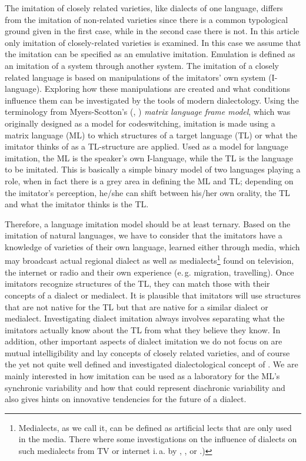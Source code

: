 \documentclass[output=paper]{LSP/langsci}
\begin{document}
The imitation of closely related varieties, like dialects of one language, differs from the imitation of non-related varieties since there is a common typological ground given in the first case, while in the second case there is not. In this article only imitation of closely-related varieties is examined. In this case we assume that the imitation can be specified as an emulative imitation. Emulation is defined as an imitation of a system through another system. The imitation of a closely related language is based on manipulations of the imitators’ own system (I-language). Exploring how these manipulations are created and what conditions influence them can be investigated by the tools of modern dialectology. Using the terminology from Myers-Scotton’s (\citeyear{myers-scotton_duelling_1993}, \citeyear{myers-scotton_contact_2002}) \textit{matrix language frame model}, which was originally designed as a model for codeswitching, imitation is made using a matrix language (ML) to which structures of a target language (TL) or what the imitator thinks of as a TL-structure are applied. Used as a model for language imitation, the ML is the speaker’s own I-language, while the TL is the language to be imitated. This is basically a simple binary model of two languages playing a role, when in fact there is a grey area in defining the ML and TL; depending on the imitator’s perception, he/she can shift between his/her own orality, the TL and what the imitator thinks is the TL.


Therefore, a language imitation model should be at least ternary. Based on the imitation of natural languages, we have to consider that the imitators have a knowledge of varieties of their own language, learned either through media, which may broadcast actual regional dialect as well as medialects\footnote{Medialects, as we call it, can be defined as artificial lects that are only used in the media. There where some investigations on the influence of dialects on such medialects from TV or internet i.\,a. by \cite{kleiner_medienbairisch_2013}, \cite{androutsopoulos_intermediale_2012}, \cite{riemann_neue_2009} or \cite{mayer_mia_2009}.)} found on television, the internet or radio and their own experience (e.\,g. migration, travelling). Once imitators recognize structures of the TL, they can match those with their concepts of a dialect or medialect. It is plausible that imitators will use structures that are not native for the TL but that are native for a similar dialect or medialect. Investigating dialect imitation always involves separating what the imitators actually know about the TL from what they believe they know. In addition, other important aspects of dialect imitation we do not focus on are mutual intelligibility and lay concepts of closely related varieties, and of course the yet not quite well defined and investigated dialectological concept of . We are mainly interested in how imitation can be used as a laboratory for the ML's synchronic variability and how that could represent diachronic variability and also gives hints on innovative tendencies for the future of a dialect. 
\end{document}

